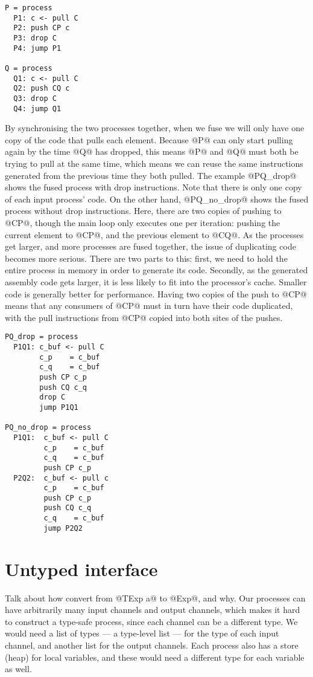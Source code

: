 \begin{lstlisting}
P = process
  P1: c <- pull C
  P2: push CP c
  P3: drop C
  P4: jump P1

Q = process
  Q1: c <- pull C
  Q2: push CQ c
  Q3: drop C
  Q4: jump Q1
\end{lstlisting}

By synchronising the two processes together, when we fuse we will only have one copy of the code that pulls each element.
Because @P@ can only start pulling again by the time @Q@ has dropped, this means @P@ and @Q@ must both be trying to pull at the same time, which means we can reuse the same instructions generated from the previous time they both pulled.
The example @PQ_drop@ shows the fused process with drop instructions.
Note that there is only one copy of each input process' code.
On the other hand, @PQ_no_drop@ shows the fused process without drop instructions.
Here, there are two copies of pushing to @CP@, though the main loop only executes one per iteration: pushing the current element to @CP@, and the previous element to @CQ@.
As the processes get larger, and more processes are fused together, the issue of duplicating code becomes more serious.
There are two parts to this: first, we need to hold the entire process in memory in order to generate its code.
Secondly, as the generated assembly code gets larger, it is less likely to fit into the processor's cache.
Smaller code is generally better for performance.
Having two copies of the push to @CP@ means that any consumers of @CP@ must in turn have their code duplicated, with the pull instructions from @CP@ copied into both sites of the pushes.

\begin{lstlisting}
PQ_drop = process
  P1Q1: c_buf <- pull C
        c_p    = c_buf
        c_q    = c_buf
        push CP c_p
        push CQ c_q
        drop C
        jump P1Q1

PQ_no_drop = process
  P1Q1:  c_buf <- pull C
         c_p    = c_buf
         c_q    = c_buf
         push CP c_p
  P2Q2:  c_buf <- pull c
         c_p    = c_buf
         push CP c_p
         push CQ c_q
         c_q    = c_buf
         jump P2Q2
\end{lstlisting}




\section{Untyped interface}
Talk about how convert from @TExp a@ to @Exp@, and why.
Our processes can have arbitrarily many input channels and output channels, which makes it hard to construct a type-safe process, since each channel can be a different type.
We would need a list of types --- a type-level list --- for the type of each input channel, and another list for the output channels.
Each process also has a store (heap) for local variables, and these would need a different type for each variable as well.

